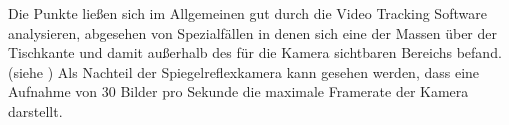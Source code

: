  Die Punkte ließen sich im Allgemeinen gut durch die Video Tracking Software analysieren, abgesehen von Spezialfällen in denen sich eine der Massen über der Tischkante und damit außerhalb des für die Kamera sichtbaren Bereichs befand.(siehe )
Als Nachteil der Spiegelreflexkamera kann gesehen werden, dass eine Aufnahme von 30 Bilder pro Sekunde die maximale Framerate der Kamera darstellt.

